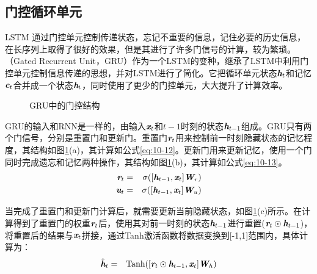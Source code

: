 \subsection{门控循环单元}

\parinterval LSTM 通过门控单元控制传递状态，忘记不重要的信息，记住必要的历史信息，在长序列上取得了很好的效果，但是其进行了许多门信号的计算，较为繁琐。{\small{}}（Gated Recurrent Unit，GRU）作为一个LSTM的变种，继承了LSTM中利用门控单元控制信息传递的思想，并对LSTM进行了简化。它把循环单元状态$\textbf{\em h}_t$和记忆$\textbf{\em c}_t$合并成一个状态$\textbf{\em h}_t$，同时使用了更少的门控单元，大大提升了计算效率。

\begin{figure}[htp]
\centering
{}
\caption{GRU中的门控结构}
\label{fig:10-13}
\end{figure}

\parinterval GRU的输入和RNN是一样的，由输入$\textbf{\em x}_t$和$t-1$时刻的状态$\textbf{\em h}_{t-1}$组成。GRU只有两个门信号，分别是重置门和更新门。重置门$\textbf{\em r}_t$用来控制前一时刻隐藏状态的记忆程度，其结构如图\ref{fig:10-13}(a)，其计算如公式\eqref{eq:10-12}。更新门用来更新记忆，使用一个门同时完成遗忘和记忆两种操作，其结构如图\ref{fig:10-13}(b)，其计算如公式\eqref{eq:10-13}。
\begin{eqnarray}
\textbf{\em r}_t & = &\sigma ([\textbf{\em h}_{t-1},\textbf{\em x}_{t}] \textbf{\em W}_r ) \label{eq:10-12} \\
\textbf{\em u}_t & = & \sigma ([\textbf{\em h}_{t-1},\textbf{\em x}_{t}] \textbf{\em W}_u ) \label{eq:10-13}
\end{eqnarray}

\parinterval 当完成了重置门和更新门计算后，就需要更新当前隐藏状态，如图\ref{fig:10-13}(c)所示。在计算得到了重置门的权重$\textbf{\em r}_t$后，使用其对前一时刻的状态$\textbf{\em h}_{t-1}$进行重置($\textbf{\em r}_t \odot \textbf{\em h}_{t-1}$)，将重置后的结果与$\textbf{\em x}_t$拼接，通过Tanh激活函数将数据变换到[-1,1]范围内，具体计算为：
\begin{eqnarray}
\hat{\textbf{\em h}}_t &=& \textrm{Tanh} ([\textbf{\em r}_t \odot \textbf{\em h}_{t-1},\textbf{\em x}_{t}] \textbf{\em W}_h )
\label{eq:10-14}
\end{eqnarray}

